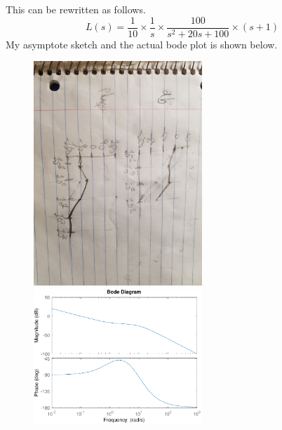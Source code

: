 \documentclass[12pt]{article}
\begin{document}
This can be rewritten as follows.
\[L(s)=\frac{1}{10}\times\frac{1}{s}\times\frac{100}{s^2+20s+100}\times(s+1)\]
My asymptote sketch and the actual bode plot is shown below.
\begin{figure}[H]
    \begin{center}
        \includegraphics[width=2.5in]{problem1g.jpg}
        \includegraphics[width=2.5in]{problem1g.pdf}
    \end{center}
\end{figure}
\end{document}
